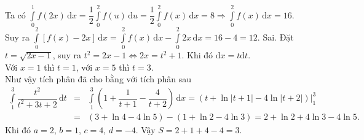 \begin{ex}
{\begin{itemchoice}
			Ta có $\displaystyle\int\limits_0^1 f(2x)\mathrm{\,d}x=\dfrac{1}{2}\displaystyle\int\limits_0^2 f(u)\mathrm{\,d}u=\dfrac{1}{2}\displaystyle\int\limits_0^2 f(x)\mathrm{\,d}x=8\Rightarrow\displaystyle\int\limits_0^2 f (x)\mathrm{\,d}x=16$.\\
			Suy ra $\displaystyle\int\limits_0^2[f(x)-2x]\mathrm{\,d}x=\displaystyle\int\limits_0^2 f(x)\mathrm{\,d}x-\displaystyle\int\limits_0^2 2 x\mathrm{\,d}x=16-4=12$.
			\itemch Sai. 	Đặt $t = \sqrt{2x-1}$, suy ra $t^2 = 2x-1 \Leftrightarrow 2x = t^2+1$. Khi đó $\mathrm{d}x = t\mathrm{d}t$.\\
			Với $x=1$ thì $t=1$, với $x=5$ thì $t=3$.\\
			Như vậy tích phân đã cho bằng với tích phân sau
			\begin{eqnarray*}
				\displaystyle\int\limits_1^3 \dfrac{t^2}{t^2+3t+2} \mathrm{\,d}t &=& \displaystyle\int\limits_1^3 \left( 1 + \dfrac{1}{t+1} - \dfrac{4}{t+2} \right) \mathrm{\,d}x = \left( t + \ln|t+1| - 4\ln|t+2| \right)\bigg|_1^3\\
				&=& (3 + \ln 4 - 4\ln 5) - (1 + \ln 2 - 4\ln 3) = 2 + \ln 2 + 4\ln 3 - 4\ln 5.
			\end{eqnarray*}
			Khi đó $a=2$, $b=1$, $c=4$, $d=-4$. Vậy $S = 2+1+4-4 = 3$.
		\end{itemchoice}
	}
\end{ex}

